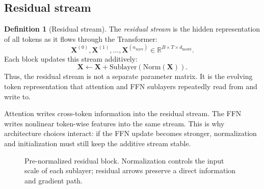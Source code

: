 \documentclass[11pt,a4paper]{article}
\theoremstyle{definition}
\newtheorem{definition}{Definition}[section]
\theoremstyle{plain}
\newcommand{\mX}{\bm{X}}
\newcommand{\mY}{\bm{Y}}
\newcommand{\reals}{\mathbb{R}}
\newcommand{\dmodel}{d_{\mathrm{model}}}
\newcommand{\nlayer}{n_{\mathrm{layer}}}
\begin{document}
\subsection{Residual stream}

\begin{definition}[Residual stream]
The \emph{residual stream} is the hidden representation of all tokens as it flows through the Transformer:
\begin{equation}
    \mX^{(0)},\mX^{(1)},\ldots,\mX^{(\nlayer)}
    \in\reals^{B\times T\times\dmodel}.
\end{equation}
Each block updates this stream additively:
\begin{equation}
    \mX\leftarrow\mX+\mathrm{Sublayer}(\mathrm{Norm}(\mX)).
\end{equation}
Thus, the residual stream is not a separate parameter matrix. It is the evolving token representation that attention and FFN sublayers repeatedly read from and write to.
\end{definition}

Attention writes cross-token information into the residual stream. The FFN writes nonlinear token-wise features into the same stream. This is why architecture choices interact: if the FFN update becomes stronger, normalization and initialization must still keep the additive stream stable.

\begin{figure}[H]
\centering
{}
\caption{Pre-normalized residual block. Normalization controls the input scale of each sublayer; residual arrows preserve a direct information and gradient path.}
\label{fig:preln-block}
\end{figure}
\end{document}

